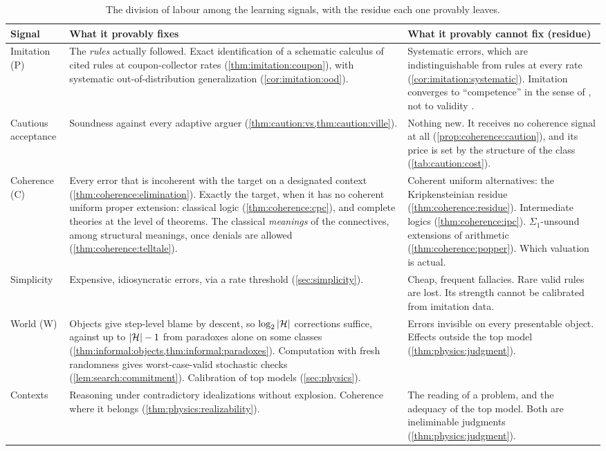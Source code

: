\begin{table}[!htbp]
\centering\small
\begin{tabularx}{\textwidth}{>{\raggedright\arraybackslash}p{2.2cm}>{\raggedright\arraybackslash}X>{\raggedright\arraybackslash}X}
\toprule
Signal & What it provably fixes & What it provably cannot fix (residue)\\
\midrule
Imitation (P) & The \emph{rules} actually followed. Exact identification of a schematic calculus of cited rules at coupon-collector rates (\cref{thm:imitation:coupon}), with systematic out-of-distribution generalization (\cref{cor:imitation:ood}). & Systematic errors, which are indistinguishable from rules at every rate (\cref{cor:imitation:systematic}). Imitation converges to ``competence'' in the sense of \citet{cohen1981can}, not to validity \citep{stich1980justification}.\\
Cautious acceptance & Soundness against every adaptive arguer (\cref{thm:caution:vs,thm:caution:ville}). & Nothing new. It receives no coherence signal at all (\cref{prop:coherence:caution}), and its price is set by the structure of the class (\cref{tab:caution:cost}).\\
Coherence (C) & Every error that is incoherent with the target on a designated context (\cref{thm:coherence:elimination}). Exactly the target, when it has no coherent uniform proper extension: classical logic (\cref{thm:coherence:cpc}), and complete theories at the level of theorems. The classical \emph{meanings} of the connectives, among structural meanings, once denials are allowed (\cref{thm:coherence:telltale}). & Coherent uniform alternatives: the Kripkensteinian residue (\cref{thm:coherence:residue}). Intermediate logics (\cref{thm:coherence:ipc}). $\Sigma_1$-unsound extensions of arithmetic (\cref{thm:coherence:popper}). Which valuation is actual.\\
Simplicity & Expensive, idiosyncratic errors, via a rate threshold (\cref{sec:simplicity}). & Cheap, frequent fallacies. Rare valid rules are lost. Its strength cannot be calibrated from imitation data.\\
World (W) & Objects give step-level blame by descent, so $\log_2|\mathcal{H}|$ corrections suffice, against up to $|\mathcal{H}|-1$ from paradoxes alone on some classes (\cref{thm:informal:objects,thm:informal:paradoxes}). Computation with fresh randomness gives worst-case-valid stochastic checks (\cref{lem:search:commitment}). Calibration of top models (\cref{sec:physics}). & Errors invisible on every presentable object. Effects outside the top model (\cref{thm:physics:judgment}).\\
Contexts & Reasoning under contradictory idealizations without explosion. Coherence where it belongs (\cref{thm:physics:realizability}). & The reading of a problem, and the adequacy of the top model. Both are ineliminable judgments (\cref{thm:physics:judgment}).\\
\bottomrule
\end{tabularx}
\caption{The division of labour among the learning signals, with the residue each one provably leaves.}\label{tab:philosophy:labour}
\end{table}

